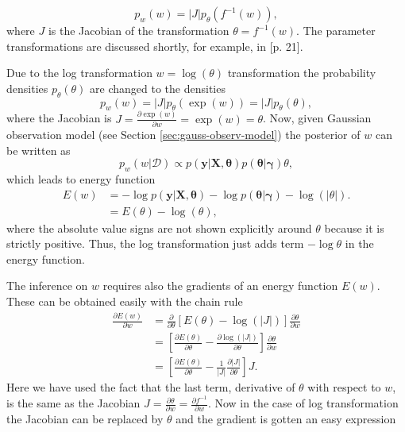 \documentclass[twoside,11pt]{article}
\newcommand{\mb}{\mathbf}
\begin{document}
\begin{equation}\label{Transform.of.variables}
p_w(w) = |J|p_{\theta}(f^{-1}(w)),
\end{equation}
where $J$ is the Jacobian of the transformation $\theta =
f^{-1}(w)$. The parameter transformations are discussed shortly,
for example, in \citet{Gelman+etal+BDA3:2013}[p. 21].

Due to the log transformation $w=\log(\theta)$ transformation the
probability densities $p_{\theta}(\theta)$ are changed to the
densities
%
\begin{equation}\label{Transform.from.th.to.log}
p_w(w) = |J|p_{\theta}(\exp(w)) = |J|p_{\theta}(\theta),
\end{equation}
%
where the Jacobian is $J = \frac{\partial \exp(w)}{\partial w} =
\exp(w) = \theta$. Now, given Gaussian observation model (see
Section \ref{sec:gauss-observ-model}) the posterior of $w$ can be
written as
%
\begin{equation}
p_w(w|\mathcal{D}) \propto
p(\mb{y}|\mb{X},\mathbf{\theta})p(\mathbf{\theta}|\mathbf{\gamma})\theta,
\end{equation}
%
which leads to energy function
%
\begin{align}
E(w) &= -\log p(\mb{y}|\mb{X},\mathbf{\theta}) - \log
p(\mathbf{\theta}|\mathbf{\gamma}) - \log(|\theta|). \nonumber \\ 
 & = E(\theta) - \log(\theta)\nonumber,
\end{align}
%
where the absolute value signs are not shown explicitly around $\theta$
because it is strictly positive. Thus, the log transformation just adds
term $-\log \theta$ in the energy function.

The inference on  $w$ requires also the gradients of an energy
function $E(w)$. These can be obtained easily with the chain rule
\begin{align}
\frac{\partial E(w)}{\partial w} &= \frac{\partial}{\partial
  \theta}\left[E(\theta)-\log(|J|)\right]\frac{\partial \theta}{\partial w}
\nonumber \\
 & = \left[\frac{\partial E(\theta)}{\partial \theta}-\frac{\partial
   \log(|J|)}{\partial \theta}\right]\frac{\partial \theta}{\partial
 w} \nonumber \\
 & = \left[\frac{\partial E(\theta)}{\partial
     \theta}-\frac{1}{|J|}\frac{\partial |J|}{\partial \theta}\right]J.
\end{align}
Here we have used the fact that the last term, derivative of $\theta$
with respect to $w$, is the same as the Jacobian $J = \frac{\partial
  \theta}{\partial w} = \frac{\partial f^{-1}}{\partial w}$.  Now in
the case of log transformation the Jacobian can be replaced by
$\theta$ and the gradient is gotten an easy expression
\end{document}
